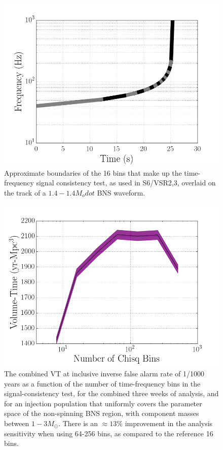 \begin{figure}
\centering
\includegraphics[width=1.0\textwidth]{papers/bns_o1_dev/figures/bin.png}
\caption{\label{fig:chisqbins} 
Approximate boundaries of the 16 bins that make up the time-frequency signal consistency test, as used in S6/VSR2,3, overlaid on the track of a $1.4-1.4M_odot$ BNS waveform. 
}
\end{figure}

\begin{figure}
\centering
\includegraphics[width=1.0\textwidth]{papers/bns_o1_dev/figures/cb.png}
\caption{\label{fig:vbin} 
The combined VT at inclusive inverse false alarm rate of 1/1000 years as a function of the number of time-frequency bins in the signal-consistency test, for the combined three weeks of analysis, and for an injection population that uniformly covers the parameter space of the non-spinning BNS region, with component masses between $1- 3M_\odot$. There is an $\approx 13\% $ improvement in the analysis sensitivity when using 64-256 bins, as compared to the reference 16 bins.
}
\end{figure}

